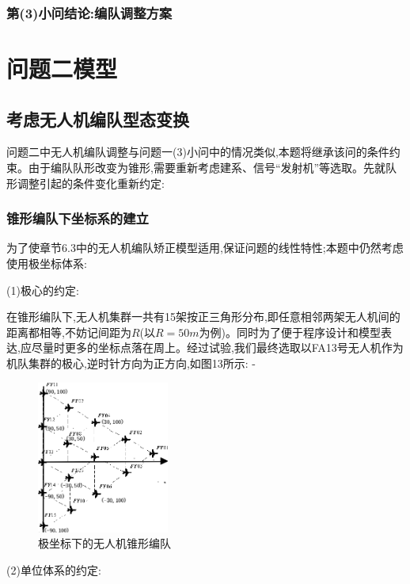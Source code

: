 \documentclass[withoutpreface,bwprint]{cumcmthesis} %
\begin{document}
		    			\subsubsection{第(3)小问结论:编队调整方案}	
		    						
		\section{问题二模型}	
	
			\subsection{考虑无人机编队型态变换}
			
				问题二中无人机编队调整与问题一(3)小问中的情况类似,本题将继承该问的条件约束。由于编队队形改变为锥形,需要重新考虑建系、信号“发射机”等选取。先就队形调整引起的条件变化重新约定:
				
		    	\subsubsection{锥形编队下坐标系的建立}
				
			     	为了使章节6.3中的无人机编队矫正模型适用,保证问题的线性特性;本题中仍然考虑使用极坐标体系:
				
				     	(1)极心的约定:
					
					    	在锥形编队下,无人机集群一共有15架按正三角形分布,即任意相邻两架无人机间的距离都相等,不妨记间距为$R$(以$R=50m$为例)。同时为了便于程序设计和模型表达,应尽量时更多的坐标点落在周上。经过试验,我们最终选取以FA13号无人机作为机队集群的极心,逆时针方向为正方向,如图13所示:
-		
							\begin{figure}[htbp!]
								\centering
								\includegraphics[height=5cm]{./figures/7-1.png}
								\caption{极坐标下的无人机锥形编队}\label{fig:15}
							\end{figure}
				
						(2)单位体系的约定:
						
\end{document}
